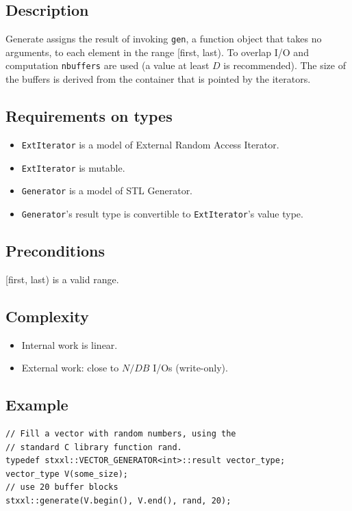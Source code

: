 \documentclass[twoside]{book}
\begin{document}
\subsection*{Description}
Generate assigns the result of invoking \texttt{gen}, a function
object that 
takes no arguments, to each element in the range [first, last). To
overlap I/O and computation \texttt{nbuffers} are used (a value at
least $D$ is recommended). The size of
the buffers is derived from the container that is pointed by the
iterators. 
\subsection*{Requirements on types}
\begin{itemize}
\item \texttt{ExtIterator} is a model of External Random Access
Iterator.
\item \texttt{ExtIterator} is mutable.
\item \texttt{Generator} is a model of STL Generator.
\item \texttt{Generator}'s result type is convertible to
\texttt{ExtIterator}'s 
value type.
\end{itemize}
\subsection*{Preconditions}
[first, last) is a valid range.
\subsection*{Complexity}
\begin{itemize}
\item Internal work is linear.
\item External work: close to $N/DB$ I/Os (write-only).
\end{itemize}

\subsection*{Example}
\begin{lstlisting}
// Fill a vector with random numbers, using the 
// standard C library function rand.
typedef stxxl::VECTOR_GENERATOR<int>::result vector_type;
vector_type V(some_size);
// use 20 buffer blocks
stxxl::generate(V.begin(), V.end(), rand, 20);
\end{lstlisting}
\newcommand{\xforeach}{{\texttt{stxxl::for\_each}}}
\end{document}
